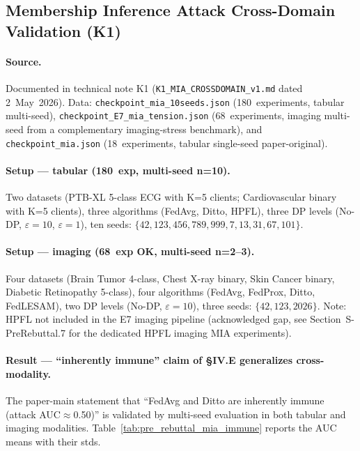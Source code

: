 \documentclass[conference]{IEEEtran}
\begin{document}
\subsection{Membership Inference Attack Cross-Domain Validation (K1)}
\label{sec:pre_rebuttal_mia_xdom}

\paragraph{Source.} Documented in technical note K1 (\texttt{K1\_MIA\_CROSSDOMAIN\_v1.md} dated 2~May~2026). Data: \texttt{checkpoint\_mia\_10seeds.json} (180~experiments, tabular multi-seed), \texttt{checkpoint\_E7\_mia\_tension.json} (68~experiments, imaging multi-seed from a complementary imaging-stress benchmark), and \texttt{checkpoint\_mia.json} (18~experiments, tabular single-seed paper-original).

\paragraph{Setup --- tabular (180~exp, multi-seed n=10).} Two datasets (PTB-XL 5-class ECG with K=5 clients; Cardiovascular binary with K=5 clients), three algorithms (FedAvg, Ditto, HPFL), three DP levels (No-DP, $\varepsilon{=}10$, $\varepsilon{=}1$), ten seeds: $\{42, 123, 456, 789, 999, 7, 13, 31, 67, 101\}$.

\paragraph{Setup --- imaging (68~exp OK, multi-seed n=2--3).} Four datasets (Brain Tumor 4-class, Chest X-ray binary, Skin Cancer binary, Diabetic Retinopathy 5-class), four algorithms (FedAvg, FedProx, Ditto, FedLESAM), two DP levels (No-DP, $\varepsilon{=}10$), three seeds: $\{42, 123, 2026\}$. Note: HPFL not included in the E7 imaging pipeline (acknowledged gap, see Section~S-PreRebuttal.7 for the dedicated HPFL imaging MIA experiments).

\paragraph{Result --- ``inherently immune'' claim of §IV.E generalizes cross-modality.} The paper-main statement that ``FedAvg and Ditto are inherently immune (attack AUC$\approx$0.50)'' is validated by multi-seed evaluation in both tabular and imaging modalities. Table~\ref{tab:pre_rebuttal_mia_immune} reports the AUC means with their stds.
\end{document}
